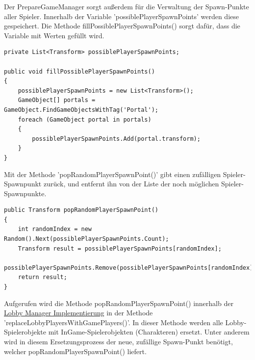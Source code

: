 Der PrepareGameManager sorgt außerdem für die Verwaltung der Spawn-Punkte aller Spieler. Innerhalb der Variable 'possiblePlayerSpawnPoints' werden diese gespeichert. Die Methode fillPossiblePlayerSpawnPoints() sorgt dafür, dass die Variable mit Werten gefüllt wird.

\begin{lstlisting}[caption= PrepareGameManager.cs fillPossiblePlayerSpawnPoints()]
private List<Transform> possiblePlayerSpawnPoints;

public void fillPossiblePlayerSpawnPoints()
{
	possiblePlayerSpawnPoints = new List<Transform>();
	GameObject[] portals = GameObject.FindGameObjectsWithTag('Portal');
	foreach (GameObject portal in portals)
	{
		possiblePlayerSpawnPoints.Add(portal.transform);
	}
}
\end{lstlisting}

Mit der Methode 'popRandomPlayerSpawnPoint()' gibt einen zufälligen Spieler-Spawnpunkt zurück, und entfernt ihn von der Liste der noch möglichen Spieler-Spawnpunkte.

\begin{lstlisting}[caption= PrepareGameManager.cs popRandomPlayerSpawnPoint()]
public Transform popRandomPlayerSpawnPoint()
{
	int randomIndex = new Random().Next(possiblePlayerSpawnPoints.Count);
	Transform result = possiblePlayerSpawnPoints[randomIndex];
	possiblePlayerSpawnPoints.Remove(possiblePlayerSpawnPoints[randomIndex]);
	return result;
}
\end{lstlisting}

Aufgerufen wird die Methode popRandomPlayerSpawnPoint() innerhalb der \hyperref[Lobby Manager Implementierung]{Lobby Manager Implementierung} in der Methode 'replaceLobbyPlayersWithGamePlayers()'. In dieser Methode werden alle Lobby-Spielerobjekte mit InGame-Spielerobjekten (Charakteren) ersetzt. Unter anderem wird in diesem Ersetzungsprozess der neue, zufällige Spawn-Punkt benötigt, welcher popRandomPlayerSpawnPoint() liefert.

